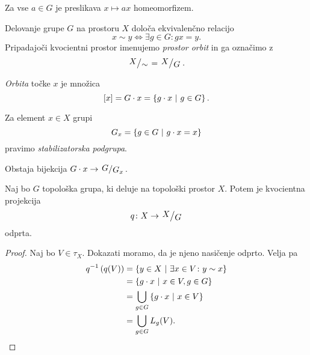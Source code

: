 \begin{opomba}
Za vse $a \in G$ je preslikava $x \mapsto ax$ homeomorfizem.
\end{opomba}

\begin{trditev}
Delovanje grupe $G$ na prostoru $X$ določa ekvivalenčno relacijo
\[
x \sim y \iff \exists g \in G \colon gx = y.
\]
Pripadajoči kvocientni prostor imenujemo
\emph{prostor orbit} in ga
označimo z
\[
\kvoc{X}{\sim} = \kvoc{X}{G}.
\]
\end{trditev}

\obvs

\begin{definicija}
\emph{Orbita} točke $x$ je množica
\[
[x] = G \cdot x = \left\{g \cdot x~\middle\vert~g \in G\right\}.
\]
\end{definicija}

\begin{definicija}
Za element $x \in X$ grupi
\[
G_x = \left\{g \in G~\middle\vert~g \cdot x = x\right\}
\]
pravimo
\emph{stabilizatorska podgrupa}.
\end{definicija}

\begin{opomba}
Obstaja bijekcija $G \cdot x \to \kvoc{G}{G_x}$.
\end{opomba}

\begin{trditev}
Naj bo $G$ topološka grupa, ki deluje na topološki prostor $X$.
Potem je kvocientna projekcija
\[
q \colon X \to \kvoc{X}{G}
\]
odprta.
\end{trditev}

\begin{proof}
Naj bo $V \in \tau_X$. Dokazati moramo, da je njeno nasičenje
odprto. Velja pa
\begin{align*}
q^{-1}\left(q(V)\right)
&=
\left\{y \in X~\middle\vert~\exists x \in V \colon y \sim x\right\}
\\
&=
\left\{g \cdot x~\middle\vert~x \in V, g \in G\right\}
\\
&=
\bigcup_{g \in G} \left\{g \cdot x~\middle\vert~x \in V\right\}
\\
&= \bigcup_{g \in G} L_g(V). \qedhere
\end{align*}
\end{proof}
